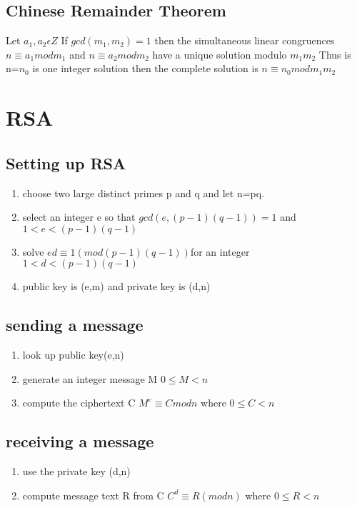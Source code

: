 \documentclass[12pt]{article}
\begin{document}
\subsection{Chinese Remainder Theorem}
Let $a_1, a_2 \epsilon Z$ If $gcd(m_1, m_2)=1$ then the simultaneous linear
congruences $n\equiv a_1mod m_1$ and $n\equiv a_2 mod m_2 $ have a unique
solution modulo $m_1m_2$ Thus is n=$n_0$ is one integer solution then the
complete solution is $n\equiv n_0 mod m_1 m_2$
\section{RSA}
\subsection{Setting up RSA}
\begin{enumerate}

  \item choose two large distinct primes p and q and let n=pq.
  \item select an integer e so that $gcd(e,(p-1)(q-1))=1$ and $1<e<(p-1)(q-1)$
  \item solve $ed\equiv 1(mod (p-1)(q-1))$for an integer $1<d<(p-1)(q-1)$
  \item public key is (e,m) and private key is (d,n)
\end{enumerate}
\subsection{sending a message}
\begin{enumerate}
  \item look up public key(e,n)
  \item generate an integer message M $0\leq M < n$
  \item compute the ciphertext C $M^e\equiv C mod n$ where $0\leq C < n$
\end{enumerate}
\subsection{receiving a message}
\begin{enumerate}
  \item use the private key (d,n)
  \item compute message text R from C $C^d\equiv R (mod n)$ where $0\leq R <n$
\end{enumerate}
\end{document}

